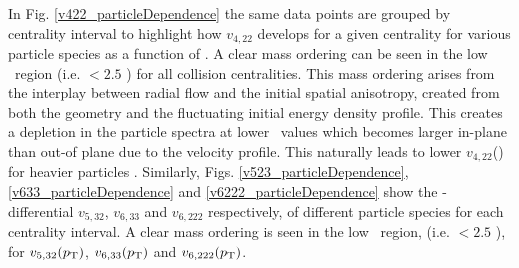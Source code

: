 \newpage

In Fig. \ref{v422_particleDependence} the same data points are grouped by centrality interval to highlight how $v_{4,22}$ develops for a given centrality for various particle species as a function of \pT.
A clear mass ordering can be seen in the low \pT~region (i.e. \pT $< 2.5$ \GeV) for all collision centralities. This mass ordering arises from the interplay between radial flow and the initial spatial anisotropy, created from both the geometry and the fluctuating initial energy density profile. This creates a depletion in the particle spectra at lower \pT~values which becomes larger in-plane than out-of plane due to the velocity profile. This naturally leads to lower $v_{4,22}$(\pT) for heavier particles \cite{Voloshin:1996nv, Huovinen:2001cy, Shen:2011eg}. Similarly, Figs. \ref{v523_particleDependence}, \ref{v633_particleDependence} and \ref{v6222_particleDependence} show the \pT-differential $v_{5,32}$, $v_{6,33}$ and $v_{6,222}$ respectively, of different particle species for each centrality interval. A clear mass ordering is seen in the low \pT~region, (i.e. \pT $< 2.5$ \GeV), for $v_{5,32}(p_{\rm{T}})$, $v_{6,33}(p_{\rm{T}})$ and $v_{6,222}(p_{\rm{T}})$.%


